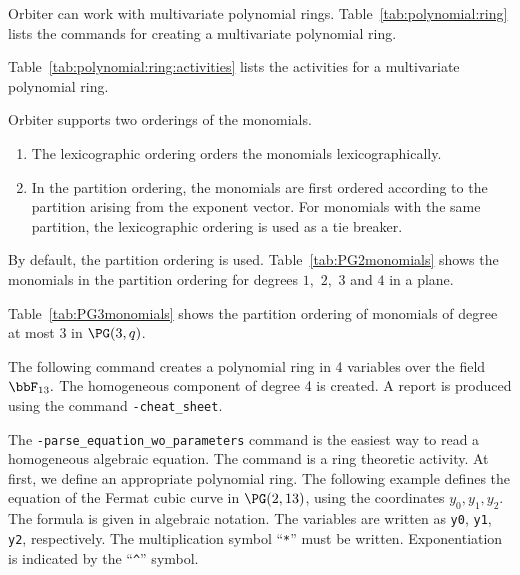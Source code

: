 Orbiter can work with multivariate polynomial rings. 
Table~\ref{tab:polynomial:ring} lists the commands 
for creating a multivariate polynomial ring.

Table~\ref{tab:polynomial:ring:activities} lists the activities  
for a multivariate polynomial ring.


\bigskip


Orbiter supports two orderings of the monomials.
\begin{enumerate}
\item
The lexicographic ordering orders the monomials lexicographically.
\item
In the partition ordering, 
the monomials are first ordered according to the partition 
arising from the exponent vector. 
For monomials with the same partition, 
the lexicographic ordering is used as a tie breaker. 
\end{enumerate}
By default, the partition ordering is used.
Table~\ref{tab:PG2monomials} 
shows the monomials in the partition ordering 
for degrees $1,$ $2,$ $3$ and $4$ in a plane.



\bigskip

Table~\ref{tab:PG3monomials} 
shows the partition ordering of monomials of 
degree at most $3$ in $\PG(3,q)$.





\bigskip



The following command creates a polynomial ring in 4 variables over the field $\bbF_{13}.$ 
The homogeneous component of degree 4 is created. A report is produced using the command \verb'-cheat_sheet'.



\bigskip


The \verb'-parse_equation_wo_parameters' command 
is the easiest way to read a homogeneous algebraic equation.
The command is a ring theoretic activity. 
At first, we define an appropriate polynomial ring. 
The following example defines the equation of the 
Fermat cubic curve in $\PG(2,13)$, using the coordinates $y_0, y_1, y_2.$ 
The formula is given in algebraic notation. 
The variables are written as \verb'y0', \verb'y1', \verb'y2', respectively. 
The multiplication symbol ``\verb'*''' must be written. 
Exponentiation is indicated by the ``\verb'^''' symbol.

